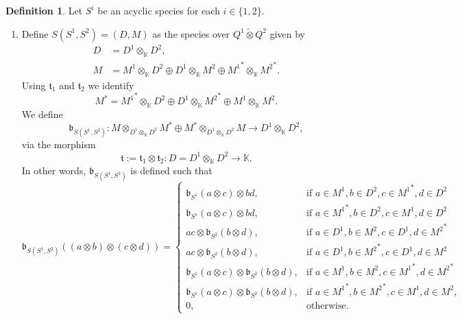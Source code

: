 \documentclass[a4paper, reqno]{amsart}
\theoremstyle{definition}
\newtheorem{mydef}[mythm]{Definition}
\newcommand{\K}{\mathbb{K}}
\renewcommand{\t}{\mathfrak{t}}
\renewcommand{\b}{\mathfrak{b}}
\begin{document}
\begin{mydef}\label{definition - S(S^1, S^2)}\cite[Definition 3.30]{soderberg2024mutation}
	Let $S^i$ be an acyclic species for each $i\in \{1, 2\}$. 
	\begin{enumerate}
		\item Define $S(S^1, S^2) = (D, M)$ as the species over $Q^1\tilde{\otimes}Q^2$ given by
		\begin{equation*}
			\begin{aligned}
				D &= D^1\otimes_\K D^2, \\
				M &= M^1\otimes_\K D^2\oplus D^1\otimes_\K M^2\oplus {M^1}^*\otimes_\K {M^2}^*.
			\end{aligned}
		\end{equation*}
		Using $\t_1$ and $\t_2$ we identify
		\begin{equation*}
			M^* = {M^1}^*\otimes_\K D^2 \oplus D^1\otimes_\K {M^2}^* \oplus M^1\otimes_\K M^2.
		\end{equation*}
		We define
		\begin{equation*}
			\b_{S(S^1, S^2)}: M\otimes_{D^1\otimes_\K D^2} M^* \oplus M^*\otimes_{D^1\otimes_\K D^2} M \to D^1\otimes_\K D^2,
		\end{equation*}
		via the morphism
		\begin{equation*}
			\t := \t_1\otimes \t_2: D = D^1\otimes_\K D^2 \to \K.
		\end{equation*}
		In other words, $\b_{S(S^1, S^2)}$ is defined such that
		\begin{equation*}
			\b_{S(S^1, S^2)}((a\otimes b)\otimes (c\otimes d)) = \begin{cases}
				\b_{S^1}(a\otimes c)\otimes bd, & \text{if } a\in M^1, b\in D^2, c\in {M^1}^*, d\in D^2 \\
				\b_{S^1}(a\otimes c)\otimes bd, & \text{if } a\in {M^1}^*, b\in  D^2, c\in M^1, d\in D^2 \\
				ac\otimes \b_{S^2}(b\otimes d), & \text{if } a\in D^1, b\in M^2, c\in D^1, d\in {M^2}^* \\
				ac\otimes \b_{S^2}(b\otimes d), & \text{if } a\in D^1, b\in {M^2}^*, c\in D^1, d\in M^2 \\
				\b_{S^1}(a\otimes c)\otimes \b_{S^2}(b\otimes d), & \text{if } a\in M^1, b\in M^2, c\in {M^1}^*, d\in {M^2}^* \\
				\b_{S^1}(a\otimes c)\otimes \b_{S^2}(b\otimes d), & \text{if } a\in {M^1}^*, b\in {M^2}^*, c\in M^1, d\in M^2, \\
				0, & \text{otherwise.}
			\end{cases}

\end{equation*}
\end{enumerate}
\end{mydef}
\end{document}

